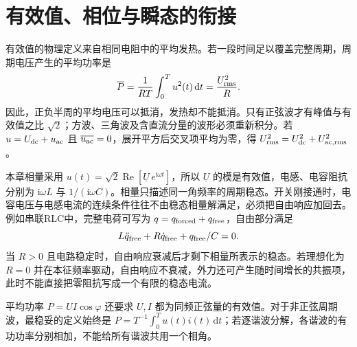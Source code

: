 \section{有效值、相位与瞬态的衔接}
有效值的物理定义来自相同电阻中的平均发热。若一段时间足以覆盖完整周期，周期电压产生的平均功率是
\[
 \overline P=\frac1{RT}\int_0^Tu^2(t)\,\mathrm dt
 =\frac{U_{\rm rms}^2}{R}.
\]
因此，正负半周的平均电压可以抵消，发热却不能抵消。只有正弦波才有峰值与有效值之比 $\sqrt2$；方波、三角波及含直流分量的波形必须重新积分。若 $u=U_{\rm dc}+u_{\rm ac}$ 且 $\overline{u_{\rm ac}}=0$，展开平方后交叉项平均为零，得
$U_{\rm rms}^2=U_{\rm dc}^2+U_{{\rm ac,rms}}^2$。

本章相量采用 $u(t)=\sqrt2\operatorname{Re}[\underline U\,e^{\mathrm i\omega t}]$，所以 $\underline U$ 的模是有效值，电感、电容阻抗分别为 $\mathrm i\omega L$ 与 $1/(\mathrm i\omega C)$。相量只描述同一角频率的周期稳态。开关刚接通时，电容电压与电感电流的连续条件往往不由稳态相量解满足，必须把自由响应加回去。
例如串联RLC中，完整电荷可写为 $q=q_{\rm forced}+q_{\rm free}$，自由部分满足
\[
 L\ddot q_{\rm free}+R\dot q_{\rm free}+q_{\rm free}/C=0.
\]
当 $R>0$ 且电路稳定时，自由响应衰减后才剩下相量所表示的稳态。若理想化为 $R=0$ 并在本征频率驱动，自由响应不衰减，外力还可产生随时间增长的共振项，此时不能直接把零阻抗写成一个有限的稳态电流。

平均功率 $P=UI\cos\varphi$ 还要求 $U,I$ 都为同频正弦量的有效值。对于非正弦周期波，最稳妥的定义始终是 $P=T^{-1}\int_0^Tu(t)i(t)\,\mathrm dt$；若逐谐波分解，各谐波的有功功率分别相加，不能给所有谐波共用一个相角。
